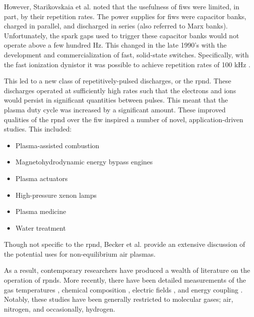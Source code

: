 However, Starikovskaia et al. noted that the usefulness of \acs{fiw}s were
limited, in part, by their repetition rates. The power supplies for \acs{fiw}s
were capacitor banks, charged in parallel, and discharged in series (also
referred to Marx banks). Unfortunately, the spark gaps used to trigger these
capacitor banks would not operate above a few hundred Hz. This changed in the
late 1990's with the development and commercialization of fast, solid-state
switches. Specifically, with the fast ionization dynistor it was possible to
achieve repetition rates of 100 kHz \cite{Efanov1997}.

This led to a new class of repetitively-pulsed discharges, or the \acs{rpnd}.
These discharges operated at sufficiently high rates such that the electrons and
ions would persist in significant quantities between pulses. This meant that the
plasma duty cycle was increased by a significant amount. These improved
qualities of the \acs{rpnd} over the \acs{fiw} inspired a number of novel,
application-driven studies. This included:
\begin{itemize}
  \item Plasma-assisted combustion \cite{Pancheshnyi2006, Starikovskaia2006, 
        Adamovich2008}
  \item Magnetohydrodynamic energy bypass engines \cite{Macheret2002,
        Adamovich2008, Schneider2009a}
  \item Plasma actuators \cite{Starikovskii2009, Adamovich2009}
  \item High-pressure xenon lamps \cite{Nikandrov2008}
  \item Plasma medicine \cite{Ayan2009, Zimmermann2012}
  \item Water treatment \cite{Foster2013}
\end{itemize}
Though not specific to the \acs{rpnd}, Becker et al. \cite{Becker2005} provide
an extensive discussion of the potential uses for non-equilibrium air plasmas.

As a result, contemporary researchers have produced a wealth of literature on
the operation of \acs{rpnd}s. More recently, there have been detailed
measurements of the gas temperatures \cite{Pilla2006, Pancheshnyi2006,
Nishihara2006, Bao2007, Lou2007, Pai2009, Zuzeek2010, Nishihara2011}, chemical
composition \cite{Bao2007, Lou2007, Pai2009}, electric fields \cite{Ito2009,
Ito2010, Muller2011a}, and energy coupling \cite{Macheret2006, Pancheshnyi2006}.
Notably, these studies have been generally restricted to molecular gases; air,
nitrogen, and occasionally, hydrogen.

